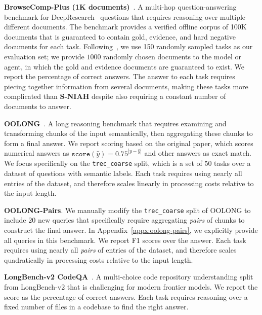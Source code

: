 \textbf{BrowseComp-Plus (1K documents)}~\citep{chen2025browsecompplusfairtransparentevaluation}. A multi-hop question-answering benchmark for DeepResearch~\citep{OpenAI_DeepResearch_2025} questions that requires reasoning over multiple different documents. The benchmark provides a verified offline corpus of 100K documents that is guaranteed to contain gold, evidence, and hard negative documents for each task. Following~\citet{sun2025scalinglonghorizonllmagent}, we use 150 randomly sampled tasks as our evaluation set; we provide $1000$ randomly chosen documents to the model or agent, in which the gold and evidence documents are guaranteed to exist. We report the percentage of correct answers. The answer to each task requires piecing together information from several documents, making these tasks more complicated than \textbf{S-NIAH} despite also requiring a constant number of documents to answer.

\textbf{OOLONG}~\citep{bertsch2025oolongevaluatinglongcontext}. A long reasoning benchmark that requires examining and transforming chunks of the input semantically, then aggregating these chunks to form a final answer. We report scoring based on the original paper, which scores numerical answers as $\texttt{score}(\hat{y}) = 0.75^{|y-\hat{y}|}$ and other answers as exact match. We focus specifically on the \texttt{trec\_coarse} split, which is a set of $50$ tasks over a dataset of questions with semantic labels. Each task requires using nearly all entries of the dataset, and therefore scales linearly in processing costs relative to the input length.

\textbf{OOLONG-Pairs}. We manually modify the \texttt{trec\_coarse} split of OOLONG to include $20$ new queries that specifically require aggregating \textit{pairs} of chunks to construct the final answer. In Appendix~\ref{appx:oolong-pairs}, we explicitly provide all queries in this benchmark. We report F1 scores over the answer. Each task requires using nearly all \textit{pairs} of entries of the dataset, and therefore scales quadratically in processing costs relative to the input length.


\textbf{LongBench-v2 CodeQA}~\citep{bai2025longbenchv2deeperunderstanding}. A multi-choice code repository understanding split from LongBench-v2 that is challenging for modern frontier models. We report the score as the percentage of correct answers. Each task requires reasoning over a fixed number of files in a codebase to find the right answer.

